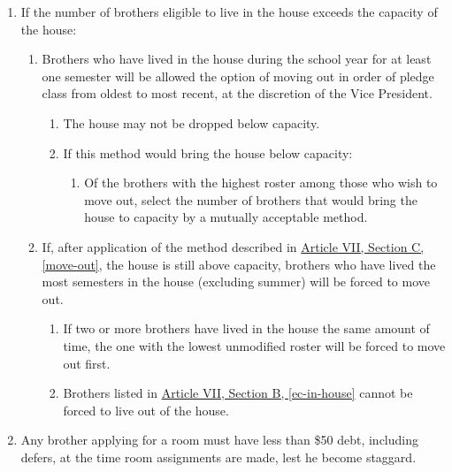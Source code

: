 	\begin{enumerate}
		\item If the number of brothers eligible to live in the house exceeds the capacity of the house:
			
			\begin{enumerate}
				\item Brothers who have lived in the house during the school year for at least one semester will be allowed the option of moving out in order of pledge class from oldest to most recent, at the discretion of the Vice President. \label{move-out}

					\begin{enumerate}
						\item The house may not be dropped below capacity.

						\item If this method would bring the house below capacity: 
							\begin{enumerate}
								\item Of the brothers with the highest \gls{roster} among those who wish to move out, select the number of brothers that would bring the house to capacity by a mutually acceptable method.
							\end{enumerate}
					\end{enumerate}

				\item If, after application of the method described in \hyperref[move-out]{Article VII, Section C, \autoref*{move-out}}, the house is still above capacity, brothers who have lived the most semesters in the house (excluding summer) will be forced to move out.
					
					\begin{enumerate}
						\item If two or more brothers have lived in the house the same amount of time, the one with the lowest unmodified \gls{roster} will be forced to move out first.

						\item Brothers listed in \hyperref[ec-in-house]{Article VII, Section B, \autoref*{ec-in-house}} cannot be forced to live out of the house.
					\end{enumerate}
			\end{enumerate}

		\item Any brother applying for a room must have less than \$50 debt, including \glspl{defer}, at the time room assignments are made, lest he become \gls{staggard}.


\end{enumerate}
